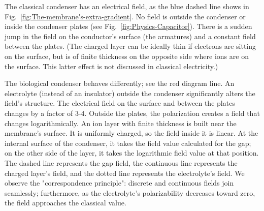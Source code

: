 The classical condenser has an electrical field, as the blue dashed line shows in Fig.~\ref{fig:The-membrane's-extra-gradient}. No field is outside the condenser or inside the condenser plates (see Fig.~\ref{fig:Physics-Capacitor}). There is a sudden jump in the field on the conductor's surface (the armatures) and a constant field between the plates.
(The charged layer can be ideally thin if electrons are sitting on the surface, but is of finite thickness on the opposite side where ions are on the surface.  This latter effect is not discussed in classical electricity.)
\else

\fi


\ifx\magyar\undefined

The biological condenser behaves differently; see the
red diagram line. An electrolyte (instead of an insulator) outside the condenser significantly alters the field's structure. The electrical field on the surface and between the plates changes by a factor of 3-4. Outside the plates, the polarization creates a field that changes logarithmically. An ion layer with finite thickness is built near the membrane's surface. It is uniformly charged, so the field inside it is linear. At the internal surface of the condenser, it takes the field value calculated for the gap; on the other side of the layer, it takes the logarithmic field value at that position. The dashed line represents the gap field, the continuous line represents the charged layer's field, and the dotted line represents the electrolyte's field. We observe the "correspondence principle": discrete and continuous fields join seamlessly; furthermore, as the electrolyte's polarizability decreases toward zero, the field approaches the classical value.
\else

\fi

